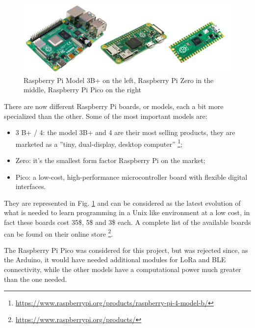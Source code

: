 			
			\begin{figure}[H]
				\centering
				\includegraphics[width=\textwidth]{resources/img/chap3/raspberry_types}
				\caption{Raspberry Pi Model 3B+ on the left, Raspberry Pi Zero in the middle, Raspberry Pi Pico on the right}
				\label{img:raspberry_board}
			\end{figure}
			
			There are now different Raspberry Pi boards, or models, each a bit more specialized than the other.
			Some of the most important models are:
			\begin{itemize}[noitemsep]
				\item 3 B+ / 4: the model 3B+ and 4 are their most selling products, they are marketed as a ''tiny, dual-display, desktop computer'' \footnote{\url{https://www.raspberrypi.org/products/raspberry-pi-4-model-b/}};
				\item Zero: it's the smallest form factor Raspberry Pi on the market;
				\item Pico: a low-cost, high-performance microcontroller board with flexible digital interfaces.
			\end{itemize}
			
			They are represented in Fig. \ref{img:raspberry_board} and can be considered as the latest evolution of what is needed to learn programming in a Unix like environment at a low cost, in fact these boards cost 35\$, 5\$ and 3\$ each.
			A complete list of the available boards can be found on their online store \footnote{\url{https://www.raspberrypi.org/products/}}.
			
			The Raspberry Pi Pico was considered for this project, but was rejected since, as the Arduino, it would have needed additional modules for LoRa and BLE connectivity, while the other models have a computational power much greater than the one needed.
				
